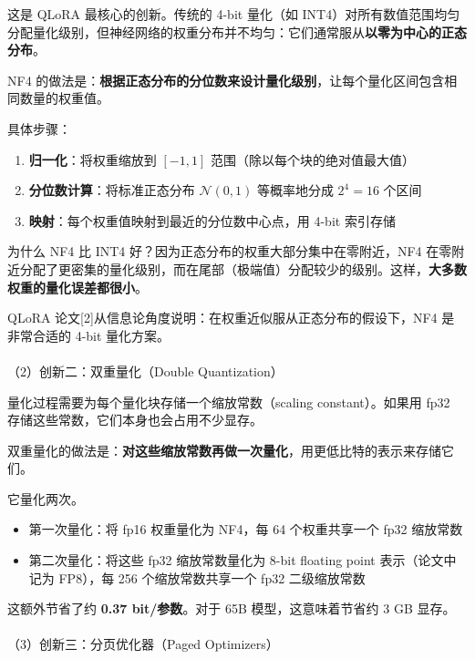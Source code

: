 \documentclass[
  chinese,
]{ctexart}
\makeatletter
\let\oldparagraph\paragraph
\renewcommand{\paragraph}{
    \@ifstar
      \xxxParagraphStar
      \xxxParagraphNoStar
  }
\newcommand{\xxxParagraphStar}[1]{\oldparagraph*{#1}\mbox{}}
\newcommand{\xxxParagraphNoStar}[1]{\oldparagraph{#1}\mbox{}}
\providecommand{\tightlist}{%
  \setlength{\itemsep}{0pt}\setlength{\parskip}{0pt}}
\makeatother
\begin{document}
这是 QLoRA 最核心的创新。传统的 4-bit 量化（如
INT4）对所有数值范围均匀分配量化级别，但神经网络的权重分布并不均匀：它们通常服从\textbf{以零为中心的正态分布}。

NF4
的做法是：\textbf{根据正态分布的分位数来设计量化级别}，让每个量化区间包含相同数量的权重值。

具体步骤：

\begin{enumerate}
\def\labelenumi{\arabic{enumi}.}
\tightlist
\item
  \textbf{归一化}：将权重缩放到 \([-1, 1]\)
  范围（除以每个块的绝对值最大值）
\item
  \textbf{分位数计算}：将标准正态分布 \(\mathcal{N}(0, 1)\) 等概率地分成
  \(2^4 = 16\) 个区间
\item
  \textbf{映射}：每个权重值映射到最近的分位数中心点，用 4-bit 索引存储
\end{enumerate}

为什么 NF4 比 INT4 好？因为正态分布的权重大部分集中在零附近，NF4
在零附近分配了更密集的量化级别，而在尾部（极端值）分配较少的级别。这样，\textbf{大多数权重的量化误差都很小}。

QLoRA 论文{[}2{]}从信息论角度说明：在权重近似服从正态分布的假设下，NF4
是非常合适的 4-bit 量化方案。

\paragraph{（2）创新二：双重量化（Double
Quantization）}\label{ux521bux65b0ux4e8cux53ccux91cdux91cfux5316double-quantization}

量化过程需要为每个量化块存储一个缩放常数（scaling constant）。如果用
fp32 存储这些常数，它们本身也会占用不少显存。

双重量化的做法是：\textbf{对这些缩放常数再做一次量化}，用更低比特的表示来存储它们。

它量化两次。

\begin{itemize}
\tightlist
\item
  第一次量化：将 fp16 权重量化为 NF4，每 64 个权重共享一个 fp32 缩放常数
\item
  第二次量化：将这些 fp32 缩放常数量化为 8-bit floating point
  表示（论文中记为 FP8），每 256 个缩放常数共享一个 fp32 二级缩放常数
\end{itemize}

这额外节省了约 \textbf{0.37 bit/参数}。对于 65B 模型，这意味着节省约 3
GB 显存。

\paragraph{（3）创新三：分页优化器（Paged
Optimizers）}\label{ux521bux65b0ux4e09ux5206ux9875ux4f18ux5316ux5668paged-optimizers}
\end{document}
